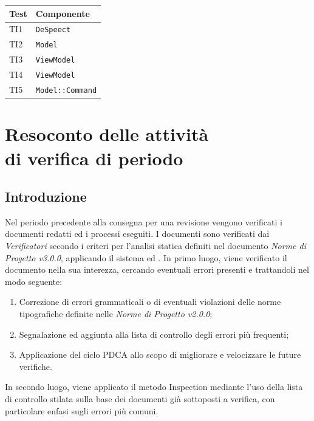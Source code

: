 \documentclass[openany,12pt,a4paper]{report}
\begin{document}
\begin{longtable}{| p{3cm} |p{6cm}|}
	\hline
	\textbf{Test} & \textbf{Componente}\\
	\hline
	\endhead
	TI1&\verb|DeSpeect|
	\\[1em]	
	\hline	
	TI2&\verb|Model|
	\\[1em]	
	\hline	
	TI3&\verb|ViewModel|
	\\[1em]	
	\hline	
	TI4&\verb|ViewModel|
	\\[1em]	
	\hline	
	TI5&\verb|Model::Command|
	\\[1em]
	\hline
\end{longtable}


\chapter{Resoconto delle attività \\ di verifica di periodo}

\section{Introduzione}

Nel periodo precedente alla consegna per una revisione vengono verificati i documenti redatti ed i processi eseguiti. I documenti sono verificati dai \textit{Verificatori} secondo i criteri per l'analisi statica definiti nel documento \textit{Norme di Progetto v3.0.0}, applicando il sistema  ed . In primo luogo, viene verificato il documento nella sua interezza, cercando eventuali errori presenti e trattandoli nel modo seguente:

\begin{enumerate}
	\item Correzione di errori grammaticali o di eventuali violazioni delle norme tipografiche definite nelle \textit{Norme di Progetto v2.0.0};
	\item Segnalazione ed aggiunta alla lista di controllo degli errori più frequenti;
	\item Applicazione del ciclo PDCA allo scopo di migliorare e velocizzare le future verifiche.
\end{enumerate}

\noindent In secondo luogo, viene applicato il metodo Inspection mediante l'uso della lista di controllo stilata sulla base dei documenti già sottoposti a verifica, con particolare enfasi sugli errori più comuni.
\end{document}
